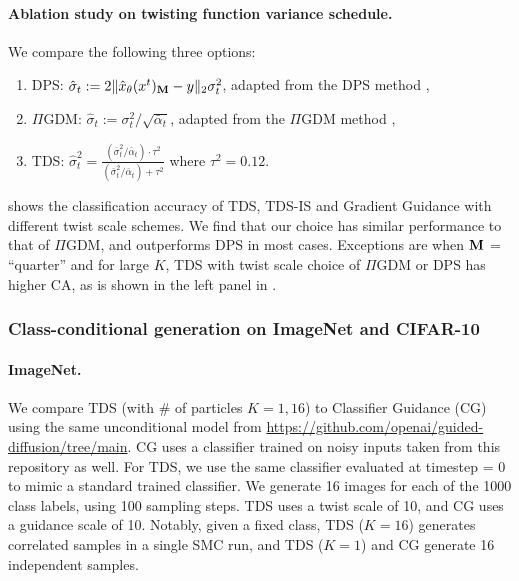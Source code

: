 \paragraph{Ablation study on twisting function variance schedule.}
We compare the following three options: 
\begin{enumerate}
    \item DPS: $\hat \sigma_t:= 2\| {\hat x}_\theta(x^{t})_{\mathbf{M}} - y\|_2 \sigma_t^2$, adapted from the DPS method \citep[Algorithm 1]{chung2022diffusion}, 
    \item $\Pi$GDM: $\hat \sigma_t:=\sigma_t^2  / \sqrt{\bar \alpha_t}$, adapted from  the $\Pi$GDM method  \citep[Algorithm 1]{song2023pseudoinverse},  
    \item TDS: $\hat \sigma_t^2 = \frac{ (\bar \sigma_t^2 / \bar \alpha_t ) \cdot \tau^2}{ (\bar \sigma_t^2 / \bar \alpha_t) + \tau^2}$ where $\tau^2 = 0.12$. 
\end{enumerate}

 shows the classification accuracy of TDS, TDS-IS and Gradient Guidance with different twist scale schemes.  We find that our choice  has similar performance to that of $\Pi$GDM, and outperforms DPS in most cases. Exceptions are when $\mathbf{M}$ = ``quarter'' and for large $K$, TDS with twist scale choice of $\Pi$GDM or DPS has higher CA, as is shown in the left panel in  .


\subsubsection{Class-conditional generation on ImageNet and CIFAR-10}
\label{supp:subsubec:inet-and-cifar}


\paragraph{ImageNet.} We compare TDS (with \# of particles $K=1,16$) to Classifier Guidance (CG) using the same unconditional model from \url{https://github.com/openai/guided-diffusion/tree/main}. CG uses a classifier trained on noisy inputs taken from this repository as well. For TDS, we use the same classifier evaluated at timestep = 0 to mimic a standard trained classifier. We generate 16 images for each of the 1000 class labels, using 100 sampling steps. TDS uses a twist scale of 10, and CG uses a guidance scale of 10. Notably, given a fixed class, TDS ($K=16$) generates correlated samples in a single SMC run, and TDS ($K=1$) and CG generate 16 independent samples. 


